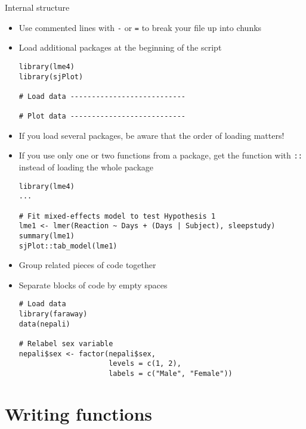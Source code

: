 \documentclass[aspectratio=169]{beamer}
\begin{document}
\begin{frame}{Internal structure}
  \begin{itemize}
    \item Use commented lines with \texttt{-} or \texttt{=} to break your file
      up into chunks
    \item Load additional packages at the beginning of the script
  \begin{lstlisting}
library(lme4)
library(sjPlot)

# Load data ---------------------------

# Plot data ---------------------------
  \end{lstlisting}
  \framebreak

    \item If you load several packages, be aware that the order of loading
      matters!
    \item If you use only one or two functions from a package, get the function
      with \verb+::+ instead of loading the whole package
  \begin{lstlisting}
library(lme4)
...

# Fit mixed-effects model to test Hypothesis 1
lme1 <- lmer(Reaction ~ Days + (Days | Subject), sleepstudy)
summary(lme1)
sjPlot::tab_model(lme1)
  \end{lstlisting}
  \framebreak

    \item Group related pieces of code together
    \item Separate blocks of code by empty spaces
  \begin{lstlisting}
# Load data
library(faraway)
data(nepali)

# Relabel sex variable
nepali$sex <- factor(nepali$sex, 
                     levels = c(1, 2),
                     labels = c("Male", "Female"))
  \end{lstlisting}
  \end{itemize}
\end{frame}


\section[Functions]{Writing functions}
\end{document}
